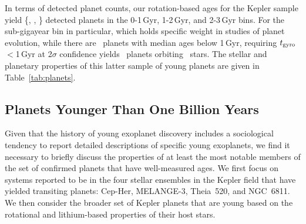 \documentclass[11pt,twocolumn,tighten]{aastex63}
\begin{document}
In terms of detected planet counts, our rotation-based ages for
the Kepler sample yield \{\nplyounggyro, \nplmidgyro, \nploldgyro\}
detected planets in the 0-1\,Gyr, 1-2\,Gyr, and 2-3\,Gyr bins.
For the sub-gigayear bin in particular, which holds specific weight in
studies of planet evolution, while there are \nplyounggyro\ planets
with median ages below 1\,Gyr, requiring $t_{\rm
gyro}$$<$1\,Gyr at 2$\sigma$ confidence yields
\nplyounggyrotwosigma\ planets orbiting \nplhostsyounggyrotwosigma\
stars.
The stellar and planetary properties of this latter sample of young
planets are given in Table~\ref{tab:planets}.


\subsection{Planets Younger Than One Billion Years}

% 
%





Given that the history of young exoplanet discovery includes a
sociological tendency to report detailed descriptions of specific
young exoplanets, we find it necessary to briefly discuss the
properties of at least the most notable members of the set of
confirmed planets that have well-measured ages.
We first focus on systems reported to be in the four stellar
ensembles in the Kepler field that have yielded transiting planets:
Cep-Her, MELANGE-3, Theia~520, and NGC~6811.
We then consider the broader set of Kepler planets that are young
based on the rotational and lithium-based properties of their host
stars.
\end{document}
